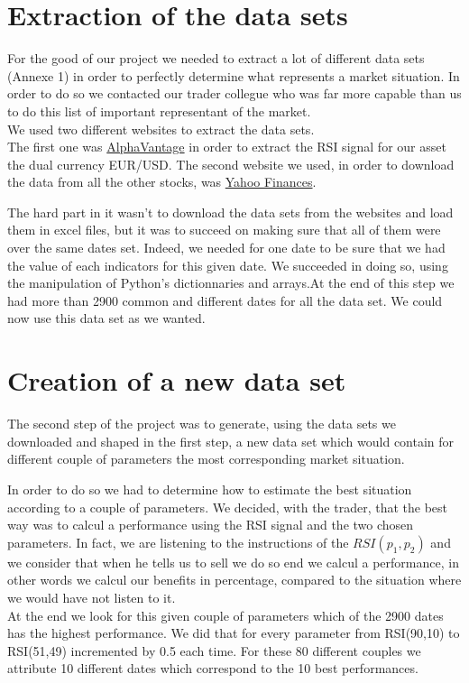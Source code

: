 \documentclass[]{article}
\begin{document}
\section{Extraction of the data sets}

\vskip 0.5cm
For the good of our project we needed to extract a lot of different data sets (Annexe 1) in order to perfectly determine what represents a market situation. In order to do so we contacted our trader collegue who was far more capable than us to do this list of important representant of the market.\\
We used two different websites to extract the data sets.\\
The first one was \href{https://www.alphavantage.co/}{AlphaVantage} in order to extract the RSI signal for our asset the dual currency EUR/USD.
The second website we used, in order to download the data from all the other stocks, was \href{https://fr.finance.yahoo.com/}{Yahoo Finances}. 

\vskip 0.5cm
The hard part in it wasn't to download the data sets from the websites and load them in excel files, but it was to succeed on making sure that all of them were over the same dates set. Indeed, we needed for one date to be sure that we had the value of each indicators for this given date. We succeeded in doing so, using the manipulation of Python's dictionnaries and arrays.At the end of this step we had more than 2900 common and different dates for all the data set. We could now use this data set as we wanted.

\section{Creation of a new data set}

\vskip 0.5cm
The second step of the project was to generate, using the data sets we downloaded and shaped in the first step, a new data set which would contain for different couple of parameters the most corresponding market situation.

\vskip 0.5cm
In order to do so we had to determine how to estimate the best situation according to a couple of parameters. We decided, with the trader, that the best way was to calcul a performance using the RSI signal and the two chosen parameters. In fact, we are listening to the instructions of the \(RSI(p_1,p_2)\) and we consider that when he tells us to sell we do so end we calcul a performance, in other words we calcul our benefits in percentage, compared to the situation where we would have not listen to it.\\
At the end we look for this given couple of parameters which of the 2900 dates has the highest performance. We did that for every parameter from RSI(90,10) to RSI(51,49) incremented by 0.5 each time. For these 80 different couples we attribute 10 different dates which correspond to the 10 best performances. 
\end{document}
